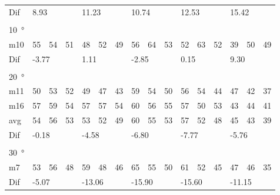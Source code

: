 \begin{table}[H]
\begin{tabular}{l|l|l|l|l|l|l|l|l|l|l|l|l|lll}
Dif & \multicolumn{3}{l|}{8.93} & \multicolumn{3}{l|}{11.23} & \multicolumn{3}{l|}{10.74} & \multicolumn{3}{l|}{12.53} & \multicolumn{3}{l}{15.42} \\ 
 \multicolumn{16}{l}{ } \\                             
\SI{10}{\degree}   & \multicolumn{3}{l|}{} & \multicolumn{3}{l|}{} & \multicolumn{3}{l|}{} & \multicolumn{3}{l|}{} & \multicolumn{3}{l}{}   \\  \hline
m10   &  55    &  54    &  51    & 48     &  52    &  49    & 56     &  64     &  53    &  52     &  63    &  52    & \multicolumn{1}{l|}{39} & \multicolumn{1}{l|}{50} & 49 \\ \hline
Dif & \multicolumn{3}{l|}{-3.77} & \multicolumn{3}{l|}{1.11} & \multicolumn{3}{l|}{-2.85} & \multicolumn{3}{l|}{0.15} & \multicolumn{3}{l}{9.30}  \\ 
 \multicolumn{16}{l}{ } \\                             
\SI{20}{\degree}   & \multicolumn{3}{l|}{} & \multicolumn{3}{l|}{} & \multicolumn{3}{l|}{} & \multicolumn{3}{l|}{} & \multicolumn{3}{l}{}   \\  \hline
m11    & 50     &  53    &  52    &  49    & 47     &  43    &  59    &  54     &  50    &   56    &  54    &   44   & \multicolumn{1}{l|}{47} & \multicolumn{1}{l|}{42} & 37 \\
m16    & 57     & 59     &  54    &  57    & 57     & 54     &   60   &  56     &  55    &  57     &  50    &  53    & \multicolumn{1}{l|}{43} & \multicolumn{1}{l|}{44} & 41 \\ \hline
avg &  54    &  56    &  53    &   53   &  52    &  49    &  60    &   55    &  53    &   57    &  52    &  48    & \multicolumn{1}{l|}{45} & \multicolumn{1}{l|}{43}  &39  \\ \hline  
Dif & \multicolumn{3}{l|}{-0.18} & \multicolumn{3}{l|}{-4.58} & \multicolumn{3}{l|}{-6.80} & \multicolumn{3}{l|}{-7.77} & \multicolumn{3}{l}{-5.76} \\ 
 \multicolumn{16}{l}{ } \\                             
\SI{30}{\degree}   & \multicolumn{3}{l|}{} & \multicolumn{3}{l|}{} & \multicolumn{3}{l|}{} & \multicolumn{3}{l|}{} & \multicolumn{3}{l}{}   \\  \hline
m7    & 53     & 56     & 48     &  59    & 48     &  46    & 65     & 55      &  50    &   61    & 52     &   45   & \multicolumn{1}{l|}{47} & \multicolumn{1}{l|}{46} & 35 \\ \hline
Dif & \multicolumn{3}{l|}{-5.07} & \multicolumn{3}{l|}{-13.06} & \multicolumn{3}{l|}{-15.90} & \multicolumn{3}{l|}{-15.60} & \multicolumn{3}{l}{-11.15}                               
\end{tabular}
\end{table}




